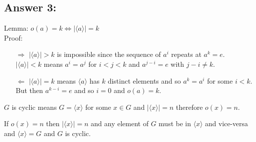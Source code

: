 \documentclass[%
  10pt,
  letterpaper
]{article}
\begin{document}
\subsection*{Answer 3:}
Lemma: $o(a) = k \iff |\langle a \rangle| = k$\\
Proof:
\begin{itemize}
\item[$\Rightarrow$] $|\langle a \rangle| > k$ is impossible since the sequence of $a^i$ repeats at $a^k=e$.\\
  $|\langle a \rangle| < k$ means $a^i = a^j$ for $i<j<k$ and $a^{j-i} = e$ with $j-i\neq k$.
  
\item[$\Leftarrow$]$|\langle a \rangle| = k$ means $\langle a \rangle$ has $k$ distinct elements and so
  $a^k =a^i$ for some $i<k$. But then $a^{k-i} = e$ and so $i=0$ and $o(a)=k$.
\end{itemize}
$G$ is cyclic means $G=\langle x \rangle$ for some $x\in G$ and $|\langle x \rangle| = n$ therefore
$o(x) = n$.

If $o(x) = n$ then $|\langle x \rangle| = n$ and any element of $G$ must be in $\langle x \rangle$ and
vice-versa and $\langle x \rangle = G$ and $G$ is cyclic.
\end{document}

